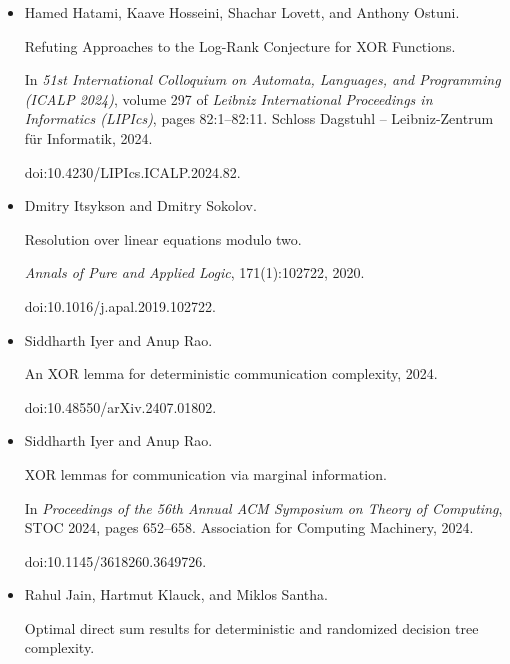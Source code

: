 \begin{itemize}
\item[] 
[32]

Hamed Hatami, Kaave Hosseini, Shachar Lovett, and Anthony Ostuni.


Refuting Approaches to the Log-Rank Conjecture for XOR Functions.


In \emph{51st International Colloquium on Automata, Languages, and
Programming (ICALP 2024)}, volume 297 of \emph{Leibniz International
Proceedings in Informatics (LIPIcs)}, pages 82:1–82:11. Schloss Dagstuhl –
Leibniz-Zentrum für Informatik, 2024.


doi:10.4230/LIPIcs.ICALP.2024.82.





\item[] 
[33]

Dmitry Itsykson and Dmitry Sokolov.


Resolution over linear equations modulo two.


\emph{Annals of Pure and Applied Logic}, 171(1):102722, 2020.


doi:10.1016/j.apal.2019.102722.





\item[] 
[34]

Siddharth Iyer and Anup Rao.


An XOR lemma for deterministic communication complexity, 2024.


doi:10.48550/arXiv.2407.01802.





\item[] 
[35]

Siddharth Iyer and Anup Rao.


XOR lemmas for communication via marginal information.


In \emph{Proceedings of the 56th Annual ACM Symposium on Theory of
Computing}, STOC 2024, pages 652–658. Association for Computing Machinery,
2024.


doi:10.1145/3618260.3649726.





\item[] 
[36]

Rahul Jain, Hartmut Klauck, and Miklos Santha.


Optimal direct sum results for deterministic and randomized decision
tree complexity.



\end{itemize}
